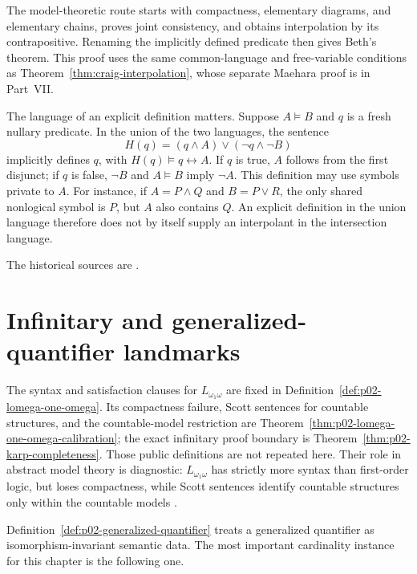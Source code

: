 The model-theoretic route starts with compactness, elementary diagrams,
and elementary chains, proves joint consistency, and obtains interpolation
by its contrapositive.  Renaming the implicitly defined predicate then gives
Beth's theorem.  This proof uses the same common-language and free-variable
conditions as Theorem~\ref{thm:craig-interpolation}, whose separate
Maehara proof is in Part~VII.

The language of an explicit definition matters.  Suppose \(A\models B\)
and \(q\) is a fresh nullary predicate.  In the union of the two
languages, the sentence
\[
 H(q)=(q\land A)\lor(\neg q\land\neg B)
\]
implicitly defines \(q\), with \(H(q)\models q\leftrightarrow A\).
If \(q\) is true, \(A\) follows from the first disjunct; if \(q\)
is false, \(\neg B\) and \(A\models B\) imply \(\neg A\).
This definition may use symbols private to \(A\).
For instance, if \(A=P\land Q\) and \(B=P\lor R\), the only shared
nonlogical symbol is \(P\), but \(A\) also contains \(Q\).
An explicit definition in the union language therefore does not
by itself supply an interpolant in the intersection language.

The historical sources are
\cite{Beth1953,Craig1957,RobinsonJointConsistency1956,Hodges1993}.

\section{Infinitary and generalized-quantifier landmarks}
\label{sec:p03-abstract-landmarks}

The syntax and satisfaction clauses for \(L_{\omega_1\omega}\) are fixed in
Definition~\ref{def:p02-lomega-one-omega}.  Its compactness failure, Scott
sentences for countable structures, and the countable-model restriction are
Theorem~\ref{thm:p02-lomega-one-omega-calibration}; the exact infinitary proof
boundary is Theorem~\ref{thm:p02-karp-completeness}.  Those public definitions
are not repeated here.  Their role in abstract model theory is diagnostic:
\(L_{\omega_1\omega}\) has strictly more syntax than first-order logic, but
loses compactness, while Scott sentences identify countable structures only
within the countable models \cite{Karp1964,Scott1965}.

Definition~\ref{def:p02-generalized-quantifier} treats a generalized
quantifier as isomorphism-invariant semantic data.  The most important
cardinality instance for this chapter is the following one.

